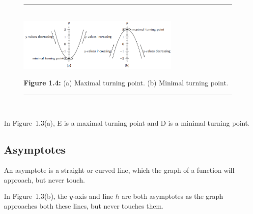     \setcounter{subfigure}{0}
	\begin{figure}[H] %
    \begin{center}
    \rule[.1in]{\figurerulewidth}{.005in} \\
        \label{m39337*uid48!!!underscore!!!media}\label{m39337*uid48!!!underscore!!!printimage}\includegraphics[width=300px]{col11306.imgs/m39337_MG10C11_035.png} %
      \vspace{2pt}
    \vspace{\rubberspace}\par \begin{cnxcaption}
	  \small \textbf{Figure 1.4: }(a) Maximal turning point. (b) Minimal turning point.
	\end{cnxcaption}
    \vspace{.1in}
    \rule[.1in]{\figurerulewidth}{.005in} \\
    \end{center}
 \end{figure}       
        \label{m39337*id236816}In Figure~1.3(a), E is a maximal turning point and D is a minimal turning point.\par 
      \label{m39337*uid49}
            \subsection{ Asymptotes}
            \nopagebreak
        \label{m39337*id236837}An asymptote is a straight or curved line, which the graph of a function will approach, but never touch.\par 
        \label{m39337*id236844}In Figure~1.3(b), the $y$-axis and line $h$ are both asymptotes as the graph approaches both these lines, but never touches them.\par 
      \label{m39337*uid50}
